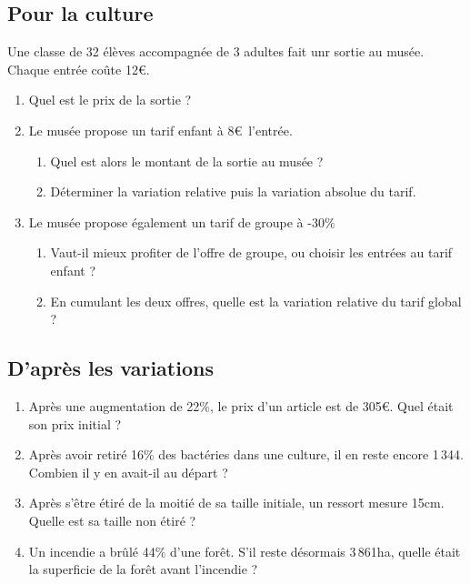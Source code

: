 \documentclass[oneside,12pt]{article}          %
\begin{document}
\subsection{Pour la culture}
Une classe de 32 élèves accompagnée de 3 adultes fait unr sortie au musée.\\
Chaque entrée coûte 12\euro.
\begin{enumerate}
    \item Quel est le prix de la sortie ?
    \item Le musée propose un tarif enfant à 8\euro\, l'entrée.
    \begin{enumerate}
        \item Quel est alors le montant de la sortie au musée ?
        \item Déterminer la variation relative puis la variation absolue du tarif.
    \end{enumerate}
    \item Le musée propose également un tarif de groupe à -30$\%$
    \begin{enumerate}
        \item Vaut-il mieux profiter de l'offre de groupe, ou choisir les entrées au tarif enfant ?
        \item En cumulant les deux offres, quelle est la variation relative du tarif global ?
    \end{enumerate}
\end{enumerate}



\subsection{D'après les variations}
\begin{enumerate}
	\item Après une augmentation de 22$\%$, le prix d'un article est de 305\euro. Quel était son prix initial ?
	\item Après avoir retiré 16$\%$ des bactéries dans une culture, il en reste encore 1\,344.\\
	Combien il y en avait-il au départ ?
	\item Après s'être étiré de la moitié de sa taille initiale, un ressort mesure 15cm.\\
	Quelle est sa taille non étiré ?
	\item Un incendie a brûlé 44$\%$ d'une forêt. S'il reste désormais 3\,861ha, quelle était la superficie de la forêt avant l'incendie ?
\end{enumerate}
\end{document}
